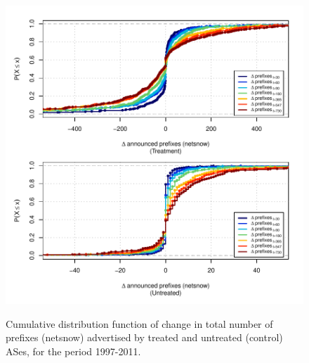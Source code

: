 \begin{figure}[H]
\begin{centering}
\begin{singlespace}
    \includegraphics[width=6in]{figures/behavior-netsnow-1997_2011-corr.pdf}
    \vspace{-2em}\\
    \caption{Cumulative distribution function of change in total number of
    prefixes (netsnow) advertised by treated and untreated (control) ASes, for
    the period 1997-2011.}
\end{singlespace}
\end{centering}
\end{figure}

